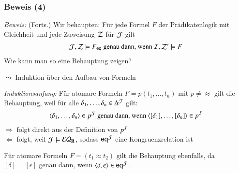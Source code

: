 \documentclass[aspectratio=1610,onlymath]{beamer}
\begin{document}
\begin{frame}[t]\frametitle{Beweis (4)}

% 

\emph{Beweis:} {\footnotesize(Forts.)}
Wir behaupten: Für jede Formel $F$ der Prädikatenlogik mit Gleichheit und jede Zuweisung $\mathcal{Z}$ für $\mathcal{J}$ gilt
\[ \mathcal{J},\mathcal{Z}\models F_{\textsf{eq}} \text{ genau dann, wenn } \mathcal{I},\mathcal{Z}'\models F \]
Wie kann man so eine Behauptung zeigen?\bigskip\pause

$\leadsto$ \alert{Induktion über den Aufbau von Formeln}\bigskip

\emph{Induktionsanfang:} Für atomare Formeln $F=p(t_1,\ldots,t_n)$ mit $p\neq{\approx}$ gilt die Behauptung,
weil für alle $\delta_1,\ldots,\delta_n\in\Delta^{\mathcal{J}}$ gilt:
\[ \langle{\delta_1,\ldots,\delta_n}\rangle\in p^{\mathcal{J}} \text{ genau dann, wenn } \langle{[\delta_1],\ldots,[\delta_n]}\rangle\in p^{\mathcal{I}} \]
$\Rightarrow$ folgt direkt aus der Definition von $p^{\mathcal{I}}$\\
$\Leftarrow$ folgt, weil $\mathcal{J}\models\mathcal{EQ}_{\textbf{\textcolor{black}{R}}}$, sodass $\textsf{eq}^{\mathcal{J}}$ eine Kongruenzrelation ist
\bigskip\pause

Für atomare Formeln $F=(t_1\approx t_2)$ gilt die Behauptung ebenfalls, da $[\delta]=[\epsilon]$ genau dann, wenn $\langle{\delta,\epsilon}\rangle\in\textsf{eq}^{\mathcal{J}}$.
\end{frame}
\end{document}

